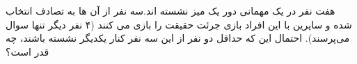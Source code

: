  هفت نفر در یک مهمانی دور یک میز نشسته اند.سه نفر از آن ها به تصادف انتخاب شده و سایرین با این افراد بازی جرئت حقیقت را بازی می کنند 
 (۴ نفر دیگر تنها سوال می‌پرسند).
 احتمال این که حداقل دو نفر از این سه نفر کنار یکدیگر نشسته باشند، چه قدر است؟ 


\\
